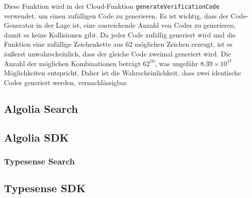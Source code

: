 Diese Funktion wird in der Cloud-Funktion \texttt{generateVerificationCode} verwendet, um einen zufälligen Code zu generieren. Es ist wichtig, dass der Code-Generator in der Lage ist, eine ausreichende Anzahl von Codes zu generieren, damit es keine Kollisionen gibt. Da jeder Code zufällig generiert wird und die Funktion eine zufällige Zeichenkette aus 62 möglichen Zeichen erzeugt, ist es äußerst unwahrscheinlich, dass der gleiche Code zweimal generiert wird. Die Anzahl der möglichen Kombinationen beträgt $62^{10}$, was ungefähr $8.39 \times 10^{17}$ Möglichkeiten entspricht. Daher ist die Wahrscheinlichkeit, dass zwei identische Codes generiert werden, vernachlässigbar.


\subsection{Algolia Search}
\subsection{Algolia SDK}

\subsubsection{Typesense Search}
\subsection{Typesense SDK}
